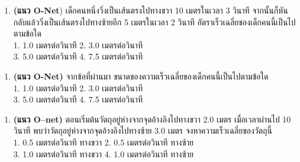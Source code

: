 \documentclass[a4paper,12pt]{book}
\begin{document}
\begin{center}
\end{center}

\begin{enumerate}
	\item {} \textbf{(แนว O-Net})  เด็กคนหนึ่งวิ่งเป็นเส้นตรงไปทางขวา  10  เมตรในเวลา  3  วินาที   จากนั้นก็หันกลับแล้ววิ่งเป็นเส้นตรงไปทางซ้ายอีก   5  เมตรในเวลา   2  วินาที   อัตราเร็วเฉลี่ยของเด็กคนนี้เป็นไปตามข้อใด \\
		1.  1.0  เมตรต่อวินาที	\hfill							2.  3.0  เมตรต่อวินาที \hfill\phantom{xx}\\
		3.  5.0  เมตรต่อวินาที	\hfill							4.  7.5  เมตรต่อวินาที \hfill\phantom{xx}
\end{enumerate}
\vspace{0.8in}
\begin{enumerate}
	\item {} \textbf{(แนว O-Net)}  จากข้อที่ผ่านมา  ขนาดของความเร็วเฉลี่ยของเด็กคนนี้เป็นไปตามข้อใด  \\
		1.  1.0  เมตรต่อวินาที	\hfill							2.  3.0  เมตรต่อวินาที \hfill\phantom{xx}\\
		3.  5.0  เมตรต่อวินาที	\hfill							4.  7.5  เมตรต่อวินาที \hfill\phantom{xx}
\end{enumerate}
\vspace{0.8in}

\newpage

\begin{enumerate}
	\item \textbf{(แนว O–net)}  ตอนเริ่มต้นวัตถุอยู่ห่างจากจุดอ้างอิงไปทางขวา  2.0  เมตร   เมื่อเวลาผ่านไป  10  	วินาที   พบว่าวัตถุอยู่ห่างจากจุดอ้างอิงไปทางซ้าย   3.0  เมตร  จงหาความเร็วเฉลี่ยของวัตถุนี้ \\
 		 1.  0.5  เมตรต่อวินาที 	 ทางขวา	\hfill	 			2.  0.5  เมตรต่อวินาที  ทางซ้าย \hfill\phantom{xx}\\
 		 3.  1.0  เมตรต่อวินาที 	 ทางขวา	\hfill	  			4.  1.0  เมตรต่อวินาที  ทางซ้าย \hfill\phantom{xx}
\end{enumerate}
\vspace{0.8in}
\end{document}

